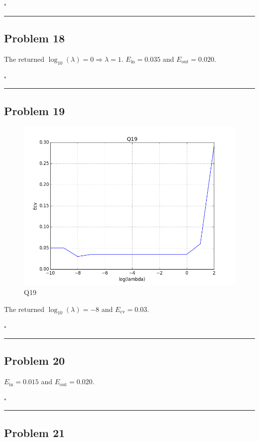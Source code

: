 \documentclass[12pt]{article}
\newcommand*{\QEDB}{\hfill\ensuremath{\square}}
\newcommand{\ParTh}[1]{\left(#1\right)}
\newcommand{\horrule}[1]{\rule{\linewidth}{#1}}
\begin{document}
\QEDB

\horrule{0.5pt}

\subsection*{Problem 18}

The returned $\log_{10}\ParTh{\lambda}=0\Rightarrow\lambda=1$. $E_{\text{in}}=0.035$ and $E_{\text{out}}=0.020$.

\QEDB

\horrule{0.5pt}

\subsection*{Problem 19}

\begin{figure}[h]
	\centering
	\includegraphics[scale=0.3]{Q19.png}
	\caption{Q19}
	\label{Q19}
\end{figure}
The returned $\log_{10}\ParTh{\lambda}=-8$ and $E_{\text{cv}}=0.03$.

\QEDB

\horrule{0.5pt}

\subsection*{Problem 20}

$E_{\text{in}}=0.015$ and $E_{\text{out}}=0.020$.

\QEDB

\horrule{0.5pt}

\subsection*{Problem 21}
\end{document}
